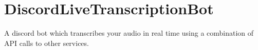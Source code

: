 \chapter{Discord\+Live\+Transcription\+Bot}
\hypertarget{md__r_e_a_d_m_e}{}\label{md__r_e_a_d_m_e}
\label{md__r_e_a_d_m_e_autotoc_md0}%
%
A discord bot which transcribes your audio in real time using a combination of API calls to other services. 